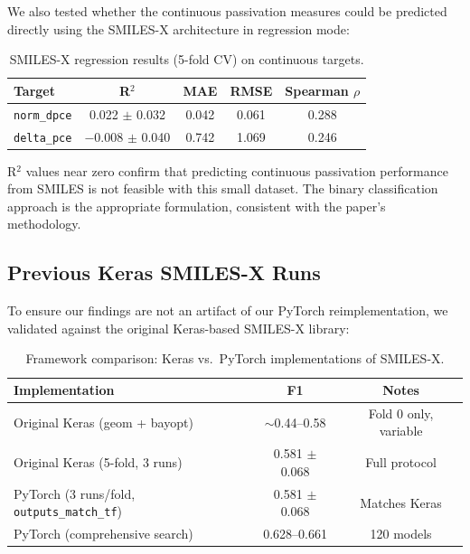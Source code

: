 \documentclass[11pt,a4paper]{article}
\begin{document}
We also tested whether the continuous passivation measures could be predicted directly using the SMILES-X architecture in regression mode:

\begin{table}[H]
\centering
\caption{SMILES-X regression results (5-fold CV) on continuous targets.}
\label{tab:regression}
\begin{tabular}{lcccc}
\toprule
Target & R$^2$ & MAE & RMSE & Spearman $\rho$ \\
\midrule
\texttt{norm\_dpce} & 0.022 $\pm$ 0.032 & 0.042 & 0.061 & 0.288 \\
\texttt{delta\_pce} & $-$0.008 $\pm$ 0.040 & 0.742 & 1.069 & 0.246 \\
\bottomrule
\end{tabular}
\end{table}

R$^2$ values near zero confirm that predicting continuous passivation performance from SMILES is not feasible with this small dataset. The binary classification approach is the appropriate formulation, consistent with the paper's methodology.

\subsection{Previous Keras SMILES-X Runs}
\label{sec:keras_runs}

To ensure our findings are not an artifact of our PyTorch reimplementation, we validated against the original Keras-based SMILES-X library:

\begin{table}[H]
\centering
\caption{Framework comparison: Keras vs.\ PyTorch implementations of SMILES-X.}
\label{tab:framework}
\begin{tabular}{lcc}
\toprule
Implementation & F1 & Notes \\
\midrule
Original Keras (geom + bayopt) & $\sim$0.44--0.58 & Fold 0 only, variable \\
Original Keras (5-fold, 3 runs) & 0.581 $\pm$ 0.068 & Full protocol \\
PyTorch (3 runs/fold, \texttt{outputs\_match\_tf}) & 0.581 $\pm$ 0.068 & Matches Keras \\
PyTorch (comprehensive search) & 0.628--0.661 & 120 models \\
\bottomrule
\end{tabular}
\end{table}
\end{document}
